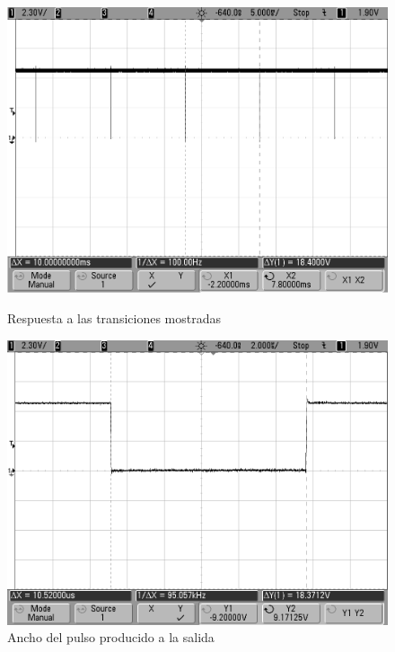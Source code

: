 \begin{figure}[H]
\begin{center}
  \begin{minipage}[b]{0.4\textwidth}
  	\begin{center}
  		\includegraphics[scale=0.25]{ejercicio3/imagenes/riple.png}
  	\end{center}
  \caption{Respuesta a las transiciones mostradas} 
  \label{3_fig4}
  \end{minipage}
  \begin{minipage}[b]{0.4\textwidth}
    \begin{center}
  		\includegraphics[scale=0.25]{ejercicio3/imagenes/tdown.png}
	\end{center}
  \caption{Ancho del pulso producido a la salida} 
  \label{3_fig5}
 \end{minipage}
\end{center}
\end{figure}

